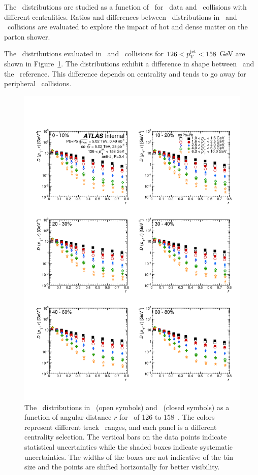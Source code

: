 
The \Dptr\ distributions are studied as a function of \ptjet\ for \pp\ data and \PbPb\ collisions with different centralities. Ratios and differences between \Dptr\ distributions in \pbpb\ and \pp\ collisions are evaluated to explore the impact of hot and dense matter on the parton shower.

The \Dptr\ distributions evaluated in \pp\ and \pbpb\ collisions for $126 < \mbox{$p_{\mathrm{T}}^{\mathrm{jet}}$} < 158$ GeV are shown in Figure~\ref{fig:dptr}. The distributions exhibit a difference in shape between \PbPb\ and the \pp\ reference. This difference depends on centrality and tends to go away for peripheral \pbpb\ collisions.

\begin{figure}[h]
\centerline{
            \includegraphics[width=1\textwidth]{figures/results/DpT_dR_jet7.pdf} 
      }
\caption{The \Dptr\ distributions in \pp\ (open symbols) and \pbpb\ (closed symbols) as a function of angular distance $r$ for \ptjet\ of 126 to 158~\GeV. The colors represent different track \pt\ ranges, and each panel is a different centrality selection. The vertical bars on the data points indicate statistical uncertainties while the shaded boxes indicate systematic uncertainties. The widths of the boxes are not indicative of the bin size and the points are shifted horizontally for better visibility.}
\label{fig:dptr}
\end{figure}


